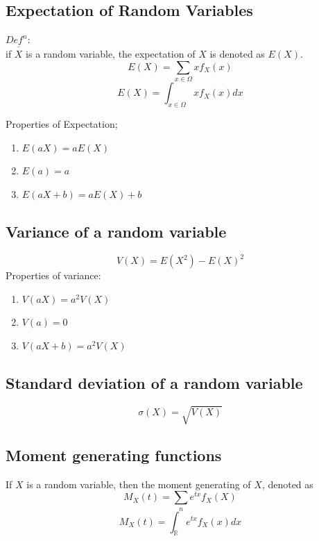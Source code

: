 \documentclass[11pt,letterpaper]{article}
\newenvironment{definition}
	{\begin{mdframed}$\underline{\textit{Def}^\textit{n}:} $\\}
	{\end{mdframed}}
\begin{document}
\subsection{Expectation of Random Variables}
\begin{definition}
   if $X$ is a random variable, the expectation of $X$ is denoted as $E(X)$.
  \[
    E(X) = \sum_{x\in\Omega} x f_X(x)
  \]
  \[
    E(X) = \int_{x\in\Omega} x f_X(x) dx
  \]
\end{definition}
Properties of Expectation;
\begin{enumerate}
  \item $E(aX) = aE(X)$
  \item $E(a) = a$
  \item $E(aX+b) = aE(X)+b$
\end{enumerate}

\subsection{Variance of a random variable}
\[
  V(X) = E(X^2) - E(X)^2
\]
Properties of variance:
\begin{enumerate}
  \item $V(aX) = a^2 V(X)$
  \item $V(a) = 0$
  \item $V(aX+b) = a^2 V(X)$
\end{enumerate}

\subsection{Standard deviation of a random variable}
\[
  \sigma(X) = \sqrt{V(X)}
\]

\subsection{Moment generating functions}
If $X$ is a random variable, then the moment generating of $X$, denoted as
\[
  M_X(t) = \sum_n e^{tx} f_X(X)
\]
\[
  M_X(t) = \int_\mathbb{R} e^{tx} f_X(x) dx 
\]
\end{document}
